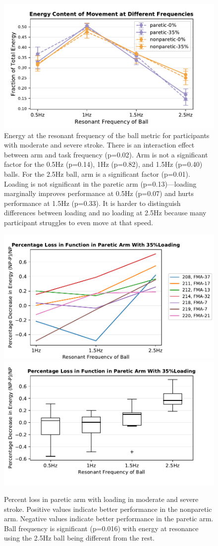 \documentclass{article}
\begin{document}
\begin{figure}[!ht]
     \centering
     \includegraphics[width=0.49\linewidth]{Plots/e_at_res_raw_ms.pdf}
	\caption{Energy at the resonant frequency of the ball metric for participants with moderate and severe stroke. There is an interaction effect between arm and task frequency (p=0.02). Arm is not a significant factor for the 0.5Hz (p=0.14), 1Hz (p=0.82), and 1.5Hz (p=0.40) balls. For the 2.5Hz ball, arm is a significant factor (p=0.01). Loading is not significant in the paretic arm (p=0.13)---loading marginally improves performance at 0.5Hz (p=0.07) and hurts performance at 1.5Hz (p=0.33). It is harder to distinguish differences between loading and no loading at 2.5Hz because many participant struggles to even move at that speed.}
\end{figure}

\begin{figure}[!ht]
     \centering
     \includegraphics[width=0.49\linewidth]{Plots/pl_SL1_indiv_ms.pdf}
     \includegraphics[width=0.49\linewidth]{Plots/pl_SL1_ms.pdf}
	\caption{Percent loss in paretic arm with loading in moderate and severe stroke. Positive values indicate better performance in the nonparetic arm. Negative values indicate better performance in the paretic arm. Ball frequency is significant (p=0.016) with energy at resonance using the 2.5Hz ball being different from the rest.}
\end{figure}
\end{document}
